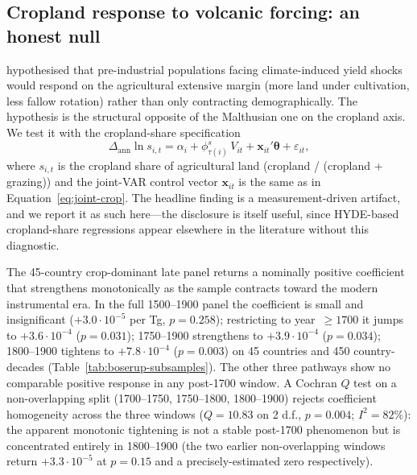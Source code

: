 \documentclass[11pt,letterpaper]{article}
\begin{document}
\subsection{Cropland response to volcanic forcing: an honest null}
\label{sec:boserup}

\citet{boserup1965} hypothesised that pre-industrial populations facing climate-induced yield shocks would respond on the agricultural extensive margin (more land under cultivation, less fallow rotation) rather than only contracting demographically. The hypothesis is the structural opposite of the Malthusian one on the cropland axis. We test it with the cropland-share specification
\begin{equation}
  \Delta_{\text{ann}} \ln s_{i,t} = \alpha_i + \phi^s_{\tau(i)}\, V_{it} + \mathbf{x}_{it}' \boldsymbol{\theta} + \varepsilon_{it},
  \label{eq:boserup}
\end{equation}
where $s_{i,t}$ is the cropland share of agricultural land (cropland / (cropland + grazing)) and the joint-VAR control vector $\mathbf{x}_{it}$ is the same as in Equation~\eqref{eq:joint-crop}. The headline finding is a measurement-driven artifact, and we report it as such here---the disclosure is itself useful, since HYDE-based cropland-share regressions appear elsewhere in the literature without this diagnostic.

The 45-country crop-dominant late panel returns a nominally positive coefficient that strengthens monotonically as the sample contracts toward the modern instrumental era. In the full 1500--1900 panel the coefficient is small and insignificant ($+3.0\!\cdot\!10^{-5}$ per Tg, $p=0.258$); restricting to year~$\ge 1700$ it jumps to $+3.6\!\cdot\!10^{-4}$ ($p=0.031$); 1750--1900 strengthens to $+3.9\!\cdot\!10^{-4}$ ($p=0.034$); 1800--1900 tightens to $+7.8\!\cdot\!10^{-4}$ ($p=0.003$) on 45 countries and 450 country-decades (Table~\ref{tab:boserup-subsamples}). The other three pathways show no comparable positive response in any post-1700 window. A Cochran $Q$ test on a non-overlapping split (1700--1750, 1750--1800, 1800--1900) rejects coefficient homogeneity across the three windows ($Q=10.83$ on 2 d.f., $p=0.004$; $I^2 = 82\%$): the apparent monotonic tightening is not a stable post-1700 phenomenon but is concentrated entirely in 1800--1900 (the two earlier non-overlapping windows return $+3.3\!\cdot\!10^{-5}$ at $p=0.15$ and a precisely-estimated zero respectively).
\end{document}
